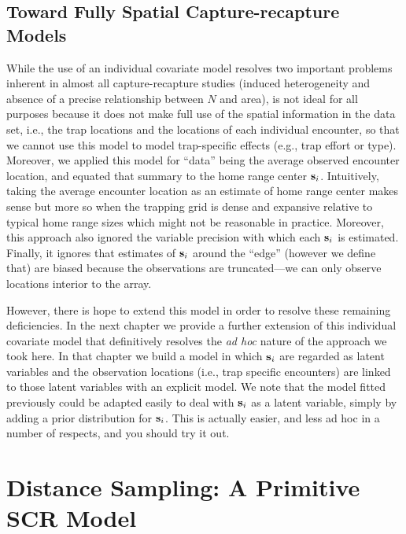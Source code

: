 \subsection{Toward Fully Spatial Capture-recapture Models}

While the use of an individual covariate model  resolves two important problems
inherent in almost all capture-recapture studies (induced
heterogeneity and absence of a precise relationship between $N$ and
area), is not ideal for all purposes because it does not make full use
of the spatial information in the data set, i.e., the trap locations
and the locations of each individual encounter, so that we cannot use
this model to model trap-specific effects (e.g., trap effort or type).
Moreover, we applied this model for ``data'' being the average
observed encounter location,
and equated that summary to the home range center ${\bf s}_{i}$. Intuitively, taking
the average encounter location as an estimate of home range center
makes sense but more so when the trapping grid is dense and expansive
relative to typical home range sizes which might not be reasonable in
practice.
Moreover, this approach also
ignored the variable precision with which each ${\bf s}_{i}$ is
estimated. Finally, it ignores that  estimates of ${\bf s}_{i}$
around the ``edge'' (however we define that) are biased because the
observations are truncated---we can only observe locations interior to
the array.

However, there is hope to extend this model in order to resolve
these remaining deficiencies.  In the next chapter we provide a further
extension of this individual covariate model that definitively
resolves the {\it ad hoc} nature of the approach we
took here. In that chapter we build a model in which ${\bf s}_{i}$ are
regarded as latent variables and the observation locations (i.e., trap
specific encounters) are linked to those latent variables with an
explicit model. We note that the model fitted previously could be
adapted easily to deal with ${\bf s}_{i}$ as a latent variable, simply
by adding a prior distribution for ${\bf s}_{i}$.  This is actually
easier, and less ad hoc in a number of respects, and you should try it out.



\section{Distance Sampling: A Primitive SCR Model}

